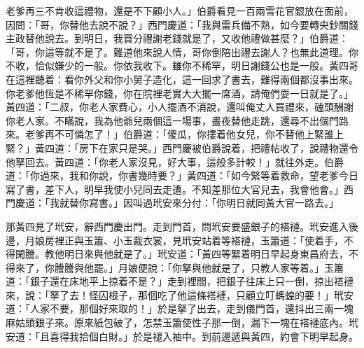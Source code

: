 老爹再三不肯收這禮物，還是不下顧小人。」伯爵看見一百兩雪花官銀放在面前，因問：「哥，你替他去說不說？」西門慶道：「我與雷兵備不熟，如今要轉央鈔關錢主政替他說去。到明日，我買分禮謝老錢就是了，又收他禮做甚麼？」伯爵道：「哥，你這等就不是了。難道他來說人情，哥你倒陪出禮去謝人？也無此道理。你不收，恰似嫌少的一般。你依我收下。雖你不稀罕，明日謝錢公也是一般。黃四哥在這裡聽着：看你外父和你小舅子造化，這一回求了書去，難得兩個都沒事出來。你老爹他恆是不稀罕你錢，你在院裡老實大大擺一席酒，請俺們耍一日就是了。」{}黃四道：「二叔，你老人家費心，小人擺酒不消說，還叫俺丈人買禮來，磕頭酬謝你老人家。不瞞說，我為他爺兒兩個這一場事，晝夜替他走跳，還尋不出個門路來。老爹再不可憐怎了！」伯爵道：「傻瓜，你摟着他女兒，你不替他上緊誰上緊？」{}黃四道：「房下在家只是哭。」西門慶被伯爵說着，把禮帖收了，說禮物還令他拏回去。{}黃四道：「你老人家沒見，好大事，這般多計較！」就往外走。伯爵道：「你過來，我和你說，你書幾時要？」黃四道：「如今緊等着救命，望老爹今日寫了書，差下人，明早我使小兒同去走遭。不知差那位大官兒去，我會他會。」西門慶道：「我就替你寫書。」因叫過玳安來分付：「你明日就同黃大官一路去。」

那黃四見了玳安，辭西門慶出門。走到門首，問玳安要盛銀子的褡褳。玳安進入後邊，月娘房裡正與玉簫、小玉裁衣裳，見玳安站着等褡褳，玉簫道：「使着手，不得閑謄。教他明日來與他就是了。」玳安道：「黃四等緊着明日早起身東昌府去，不得來了，你謄謄與他罷。」月娘便說：「你拏與他就是了，只教人家等着。」玉簫道：「銀子還在床地平上掠着不是？」走到裡間，把銀子往床上只一倒，掠出褡褳來，說：「拏了去！怪囚根子，那個吃了他這條褡褳，只顧立叮螞蝗的要！」玳安道：「人家不要，那個好來取的！」於是拏了出去，走到儀門首，還抖出三兩一塊麻姑頭銀子來。{}原來紙包破了，怎禁玉簫使性子那一倒，漏下一塊在褡褳底內。玳安道：「且喜得我拾個白財。」於是褪入袖中。{}到前邊遞與黃四，約會下明早起身。

